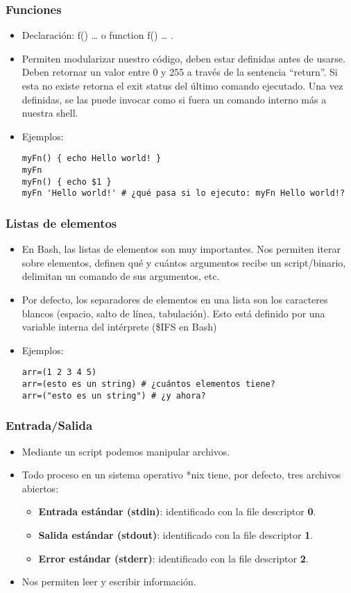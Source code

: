 \begin{frame}[fragile]
  \frametitle{Funciones}
  \begin{itemize}
	  \item Declaración: f() { … } o function f() { … }.
	  \item Permiten modularizar nuestro código, deben estar definidas antes de usarse. Deben retornar un valor entre 0 y 255 a través de la sentencia “return”. Si esta no existe retorna el exit status del último comando ejecutado. Una vez definidas, se las puede invocar como si fuera un comando interno más a nuestra shell.
    \item Ejemplos:
		\begin{lstlisting}
myFn() { echo Hello world! }
myFn
myFn() { echo $1 }
myFn 'Hello world!' # ¿qué pasa si lo ejecuto: myFn Hello world!?
		\end{lstlisting}
  \end{itemize}
\end{frame}

\begin{frame}[fragile]
  \frametitle{Listas de elementos}
  \begin{itemize}
	  \item En Bash, las listas de elementos son muy importantes. Nos permiten iterar sobre elementos, definen qué y cuántos argumentos recibe un script/binario, delimitan un comando de sus argumentos, etc.
	  \item Por defecto, los separadores de elementos en una lista son los caracteres blancos (espacio, salto de línea, tabulación). Esto está definido por una variable interna del intérprete (\$IFS en Bash)
    \item Ejemplos:
		\begin{lstlisting}
arr=(1 2 3 4 5)
arr=(esto es un string) # ¿cuántos elementos tiene?
arr=("esto es un string") # ¿y ahora?
		\end{lstlisting}
  \end{itemize}
\end{frame}

\begin{frame}
  \frametitle{Entrada/Salida}
  \begin{itemize}
	  \item Mediante un script podemos manipular archivos.
	  \item Todo proceso en un sistema operativo *nix tiene, por defecto, tres archivos abiertos:
    \begin{itemize}
      \item \textbf{Entrada estándar (stdin)}: identificado con la file descriptor \textbf{0}.
      \item \textbf{Salida estándar (stdout)}: identificado con la file descriptor \textbf{1}.
      \item \textbf{Error estándar (stderr)}: identificado con la file descriptor \textbf{2}.
    \end{itemize}
    \item Nos permiten leer y escribir información.
  \end{itemize}
\end{frame}

